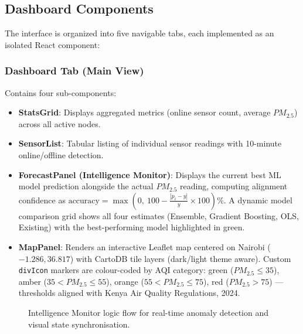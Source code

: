 \documentclass[12pt,a4paper]{article}
\begin{document}
\subsection{Dashboard Components}
The interface is organized into five navigable tabs, each implemented as an isolated React component:

\subsubsection{Dashboard Tab (Main View)}
Contains four sub-components:
\begin{itemize}[nosep]
    \item \textbf{StatsGrid}: Displays aggregated metrics (online sensor count, average $PM_{2.5}$) across all active nodes.
    \item \textbf{SensorList}: Tabular listing of individual sensor readings with 10-minute online/offline detection.
    \item \textbf{ForecastPanel (Intelligence Monitor)}: Displays the current best ML model prediction alongside the actual $PM_{2.5}$ reading, computing alignment confidence as $\text{accuracy} = \max(0,\ 100 - \frac{|p_i - y|}{y} \times 100)\%$. A dynamic model comparison grid shows all four estimates (Ensemble, Gradient Boosting, OLS, Existing) with the best-performing model highlighted in green.
    \item \textbf{MapPanel}: Renders an interactive Leaflet map centered on Nairobi ($-1.286, 36.817$) with CartoDB tile layers (dark/light theme aware). Custom \texttt{divIcon} markers are colour-coded by AQI category: green ($PM_{2.5} \leq 35$), amber ($35< PM_{2.5} \leq 55$), orange ($55< PM_{2.5} \leq 75$), red ($PM_{2.5} > 75$) --- thresholds aligned with Kenya Air Quality Regulations, 2024.
\end{itemize}

\begin{figure}[H]
\centering
{}
\caption{Intelligence Monitor logic flow for real-time anomaly detection and visual state synchronisation.}
\label{fig:intelligence_monitor}
\end{figure}
\end{document}
